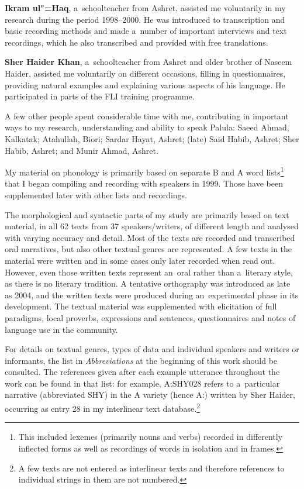 \textbf{Ikram ul"=Haq}, a~schoolteacher from Ashret, assisted me voluntarily in my research during
the period 1998--2000. He was introduced to transcription and basic recording methods and made
a~number of important interviews and text recordings, which he also transcribed and provided with
free translations.


\textbf{Sher Haider Khan}, a~schoolteacher from Ashret and older brother of Naseem Haider, assisted me
voluntarily on different occasions, filling in questionnaires, providing natural examples and
explaining various aspects of his language. He participated in parts of the FLI training programme.


A few other people spent considerable time with me, contributing in important ways to my research,
understanding and ability to speak Palula: Saeed Ahmad, Kalkatak; Atahullah, Biori; Sardar
Hayat, Ashret; (late) Said Habib, Ashret; Sher Habib, Ashret; and Munir Ahmad, Ashret.


My material on phonology is primarily based on separate B and A word lists\footnote{This included
  lexemes (primarily nouns and verbs) recorded in differently inflected forms as well as recordings
  of words in isolation and in frames.} that I began compiling and recording with speakers in
1999. Those have been supplemented later with other lists and recordings.


The morphological and syntactic parts of my study are primarily based on text material, in all 62
texts from 37 speakers/writers, of different length and analysed with varying accuracy and
detail. Most of the texts are recorded and transcribed oral narratives, but also other textual
genres are represented. A few texts in the material were written and in some cases only later
recorded when read out. However, even those written texts represent an~oral rather than a~literary
style, as there is no literary tradition. A tentative orthography was introduced as late as 2004,
and the written texts were produced during an~experimental phase in its development. The textual
material was supplemented with elicitation of full paradigms, local proverbs, expressions and sentences,
questionnaires and notes of language use in the community.

\largerpage[-1]
For details on textual genres, types of data and individual speakers and writers or informants, the
list in \textit{Abbreviations} at the beginning of this work should be consulted. The references given after
each example utterance throughout the work can be found in that list: for example, A:SHY028 refers to
a~particular narrative (abbreviated SHY) in the A variety (hence A:) written by Sher Haider, occurring as entry 28 in my interlinear text database.\footnote{A few texts are not entered as interlinear texts and therefore references to individual strings in them are not numbered.}


